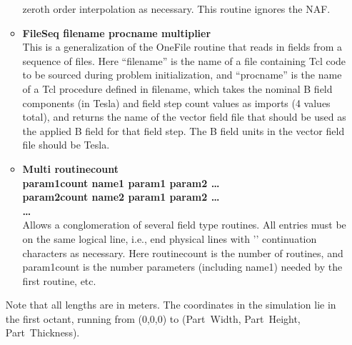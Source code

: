 \begin{itemize}
\begin{itemize}
          zeroth order interpolation as necessary.  This routine ignores
          the NAF.
        \item {\bf FileSeq filename procname multiplier}\\
          This is a generalization of the OneFile routine that reads in
          fields from a sequence of files.  Here ``filename'' is the
          name of a file containing Tcl code to be sourced during
          problem initialization, and ``procname'' is the name of a Tcl
          procedure defined in filename, which takes the nominal B field
          components (in Tesla) and field step count values as imports
          (4 values total), and returns the name of the vector field
          file that should be used as the applied B field for that field
          step.  The B field units in the vector field file should be
          Tesla.
        \item {\bf Multi routinecount \bs\\
                   param1count name1 param1 param2 \ldots \bs\\
                   param2count name2 param1 param2 \ldots \bs\\
                   \ldots}\\
          Allows a conglomeration of several field type routines.  All
          entries must be on the same logical line, i.e., end physical
          lines with '\bs' continuation characters as necessary.
          Here routinecount is the number of routines, and param1count
          is the number parameters (including name1) needed by the
          first routine, etc.
     \end{itemize}
     Note that all lengths are in meters.  The coordinates in the
     simulation lie in the first octant, running from (0,0,0) to
     (Part~Width, Part~Height, Part~Thickness).
\end{itemize}

